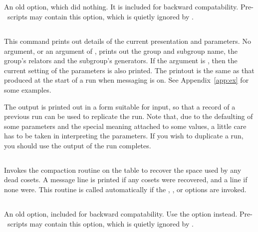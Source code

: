 \subsection{}
\label{cmd:parameters}

An old option, which did nothing.
It is included for backward compatability.
Pre-\acet\ scripts may contain this option, which is quietly ignored
  by \acet.

\subsection{}
\label{cmd:print details}

This command prints out details of the current presentation and parameters.
No argument, or an argument of , prints out the group and
  subgroup name, the group's relators and the subgroup's generators.
If the argument is , then the current setting of the parameters is
  also printed.
The printout is the same as that produced at the start of a run when
  messaging is on.
See Appendix~\ref{app:ex} for some examples.

The output is printed out in a form suitable for input, so that a record
  of a previous run can be used to replicate the run.
Note that, due to the defaulting of some parameters and the special
  meaning attached to some values, a little care has to be taken in
  interpreting the parameters.
If you wish to  duplicate a run, you should use the output
  of   the run completes.

\subsection{}
\label{cmd:recover}
\label{cmd:contiguous}

Invokes the compaction routine on the table to recover the space used by
  any dead cosets.
A  message line is printed if any cosets were recovered, and a
   line if none were.
This routine is called automatically if the , , 
  or  options are invoked.

\subsection{}
\label{cmd:restart}

An old option, included for backward compatability.
Use the  option instead.
Pre-\acet\ scripts may contain this option, which is quietly ignored
  by \acet.


